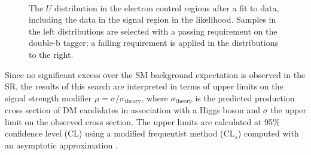 \begin{figure}
  \\
\caption{The $U$ distribution in the electron control regions after a fit to data, including the data in the signal region in the likelihood. Samples in the left distributions are selected with a passing requirement on the double-b tagger; a failing requirement is applied in the distributions to the right.}
\label{Fig_cr_2}
\end{figure}

Since no significant excess over the SM background expectation is observed in the SR, the results of this search are interpreted in terms of upper limits on the signal strength modifier $\mu=\sigma/\sigma_\text{theory}$, where $\sigma_\text{theory}$ is the predicted production cross 
section of DM candidates in association with a Higgs boson and $\sigma$ the upper limit on the observed cross section. 
The upper limits are calculated at 95\% confidence level (CL) using a modified frequentist method (CL$_s$) \cite{yellowReport, bib:CLS1, bib:CLS2} computed with an asymptotic approximation \cite{bib:CLS3}. 


